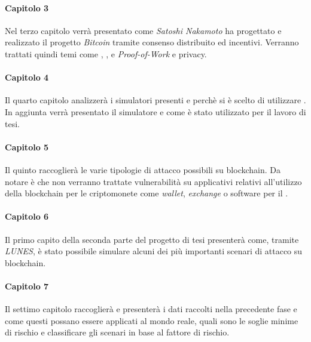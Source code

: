 \paragraph{Capitolo 3}
Nel terzo capitolo verrà presentato come \textit{Satoshi Nakamoto} ha progettato e realizzato il progetto \textit{Bitcoin} tramite consenso distribuito ed incentivi. Verranno trattati quindi temi come , ,  e \textit{Proof-of-Work} e privacy.

\paragraph{Capitolo 4}
Il quarto capitolo analizzerà i simulatori presenti e perchè si è scelto di utilizzare .
In aggiunta verrà presentato il simulatore e come è stato utilizzato per il lavoro di tesi.

\paragraph{Capitolo 5}
Il quinto raccoglierà le varie tipologie di attacco possibili su blockchain. Da notare è che non verranno trattate vulnerabilità su applicativi relativi all'utilizzo della blockchain per le criptomonete come \textit{wallet}, \textit{exchange} o software per il .

\paragraph{Capitolo 6}
Il primo capito della seconda parte del progetto di tesi presenterà come, tramite \textit{LUNES}, è stato possibile simulare alcuni dei più importanti scenari di attacco su blockchain.

\paragraph{Capitolo 7}
Il settimo capitolo raccoglierà e presenterà i dati raccolti nella precedente fase e come questi possano essere applicati al mondo reale, quali sono le soglie minime di rischio e classificare gli scenari in base al fattore di rischio.

